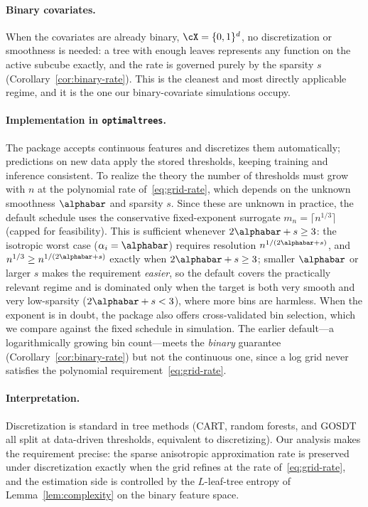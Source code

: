 \paragraph{Binary covariates.}
When the covariates are already binary, $\cX = \{0,1\}^d$, no discretization or
smoothness is needed: a tree with enough leaves represents any function on the
active subcube exactly, and the rate is governed purely by the sparsity $s$
(Corollary~\ref{cor:binary-rate}). This is the cleanest and most directly
applicable regime, and it is the one our binary-covariate simulations occupy.

\paragraph{Implementation in \texttt{optimaltrees}.}
The package accepts continuous features and discretizes them automatically;
predictions on new data apply the stored thresholds, keeping training and
inference consistent. To realize the theory the number of thresholds must grow
with $n$ at the polynomial rate of~\eqref{eq:grid-rate}, which depends on the
unknown smoothness $\alphabar$ and sparsity $s$. Since these are unknown in
practice, the default schedule uses the conservative fixed-exponent surrogate
$m_n = \lceil n^{1/3} \rceil$ (capped for feasibility). This is sufficient
whenever $2\alphabar + s \ge 3$: the isotropic worst case
($\alpha_i = \alphabar$) requires resolution $n^{1/(2\alphabar+s)}$, and
$n^{1/3} \ge n^{1/(2\alphabar+s)}$ exactly when $2\alphabar + s \ge 3$; smaller
$\alphabar$ or larger $s$ makes the requirement \emph{easier}, so the default
covers the practically relevant regime and is dominated only when the target is
both very smooth and very low-sparsity ($2\alphabar+s < 3$), where more bins are
harmless. When the exponent is in doubt, the package also offers cross-validated
bin selection, which we compare against the fixed schedule in simulation. The
earlier default---a logarithmically growing bin count---meets the \emph{binary}
guarantee (Corollary~\ref{cor:binary-rate}) but not the continuous one, since a
log grid never satisfies the polynomial requirement~\eqref{eq:grid-rate}.

\paragraph{Interpretation.}
Discretization is standard in tree methods (CART, random forests, and GOSDT all
split at data-driven thresholds, equivalent to discretizing). Our analysis makes
the requirement precise: the sparse anisotropic approximation rate is preserved
under discretization exactly when the grid refines at the rate
of~\eqref{eq:grid-rate}, and the estimation side is controlled by the
$L$-leaf-tree entropy of Lemma~\ref{lem:complexity} on the binary feature space.
